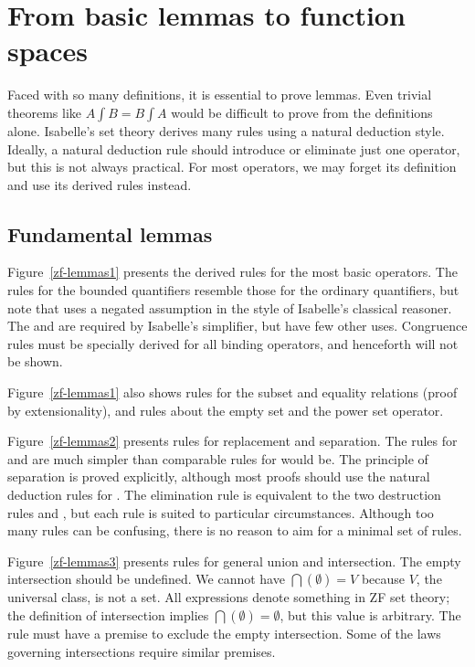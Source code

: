 \section{From basic lemmas to function spaces}
Faced with so many definitions, it is essential to prove lemmas.  Even
trivial theorems like $A \int B = B \int A$ would be difficult to
prove from the definitions alone.  Isabelle's set theory derives many
rules using a natural deduction style.  Ideally, a natural deduction
rule should introduce or eliminate just one operator, but this is not
always practical.  For most operators, we may forget its definition
and use its derived rules instead.

\subsection{Fundamental lemmas}
Figure~\ref{zf-lemmas1} presents the derived rules for the most basic
operators.  The rules for the bounded quantifiers resemble those for the
ordinary quantifiers, but note that  uses a negated assumption
in the style of Isabelle's classical reasoner.  The   and  are required by Isabelle's
simplifier, but have few other uses.  Congruence rules must be specially
derived for all binding operators, and henceforth will not be shown.

Figure~\ref{zf-lemmas1} also shows rules for the subset and equality
relations (proof by extensionality), and rules about the empty set and the
power set operator.

Figure~\ref{zf-lemmas2} presents rules for replacement and separation.
The rules for  and  are much simpler than
comparable rules for  would be.  The principle of
separation is proved explicitly, although most proofs should use the
natural deduction rules for .  The elimination rule
 is equivalent to the two destruction rules
 and , but each rule is suited to
particular circumstances.  Although too many rules can be confusing, there
is no reason to aim for a minimal set of rules.  

Figure~\ref{zf-lemmas3} presents rules for general union and intersection.
The empty intersection should be undefined.  We cannot have
$\bigcap(\emptyset)=V$ because $V$, the universal class, is not a set.  All
expressions denote something in ZF set theory; the definition of
intersection implies $\bigcap(\emptyset)=\emptyset$, but this value is
arbitrary.  The rule  must have a premise to exclude
the empty intersection.  Some of the laws governing intersections require
similar premises.


